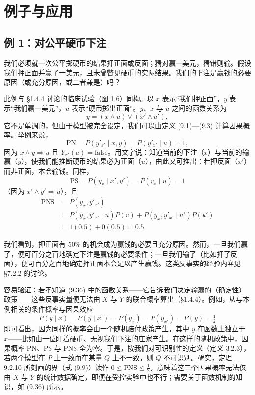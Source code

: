 \section{例子与应用}

\subsection{例 1：对公平硬币下注}

我们必须就一次公平掷硬币的结果押正面或反面；猜对赢一美元，猜错则输。假设我们押正面并赢了一美元，且未曾瞥见硬币的实际结果。我们的下注是赢钱的必要原因（或充分原因，或二者兼是）吗？

此例与 \S 1.4.4 讨论的临床试验（图 1.6）同构。以 $x$ 表示“我们押正面”，$y$ 表示“我们赢一美元”，$u$ 表示“硬币掷出正面”。$y$、$x$ 与 $u$ 之间的函数关系为
\begin{equation}
y=(x\wedge u)\vee(x'\wedge u'), \tag{9.36}
\end{equation}
它不是单调的，但由于模型被完全设定，我们可以由定义 \textup{(9.1)}—\textup{(9.3)} 计算因果概率。举例来说，
\[
\mathrm{PN}=P(y'_{x'}\mid x,y)=P(y'_{x'}\mid u)=1,
\]
因为 $x\wedge y\Rightarrow u$ 且 $Y_{x'}(u)=\text{false}$。用文字说：知道当前的下注（$x$）与当前的输赢（$y$），使我们能推断硬币的结果必为正面（$u$），由此又可推出：若押反面（$x'$）而非正面，本会输钱。同样，
\[
\mathrm{PS}=P(y_x\mid x',y')=P(y_x\mid u)=1
\]
（因为 $x'\wedge y'\Rightarrow u$），且
\begin{align*}
\mathrm{PNS} &= P(y_x,y'_{x'})\\
&= P(y_x,y'_{x'}\mid u)P(u)+P(y_x,y'_{x'}\mid u')P(u')\\
&= 1(0.5)+0(0.5)=0.5.
\end{align*}

我们看到，押正面有 50\% 的机会成为赢钱的必要且充分原因。然而，一旦我们赢了，便可百分之百地确定下注是赢钱的必要条件；一旦我们输了（比如押了反面），便可百分之百地确定押正面本会足以产生赢钱。这类反事实的经验内容见 \S 7.2.2 的讨论。

容易验证：若不知道 \textup{(9.36)} 中的函数关系——它告诉我们决定输赢的（确定性）政策——这些反事实量便无法由 $X$ 与 $Y$ 的联合概率算出（\S 1.4.4）。例如，从与本例相关的条件概率与因果效应
\[
P(y\mid x)=P(y\mid x')=P(y_x)=P(y_{x'})=P(y)=\tfrac12
\]
即可看出，因为同样的概率会由一个随机赔付政策产生，其中 $y$ 在函数上独立于 $x$——比如由一位盯着硬币、无视我们下注的庄家产生。在这样的随机政策中，因果概率 PN、PS 与 PNS 全为零。于是，按我们对可识别性的定义（定义 3.2.3），若两个模型在 $P$ 上一致而在某量 $Q$ 上不一致，则 $Q$ 不可识别。确实，定理 9.2.10 所刻画的界（式 \textup{(9.9)}）读作 $0\le\mathrm{PNS}\le\frac12$，意味着这三个因果概率无法仅由 $X$ 与 $Y$ 的统计数据确定，即便在受控实验中也不行；需要关于函数机制的知识，如 \textup{(9.36)} 所示。

